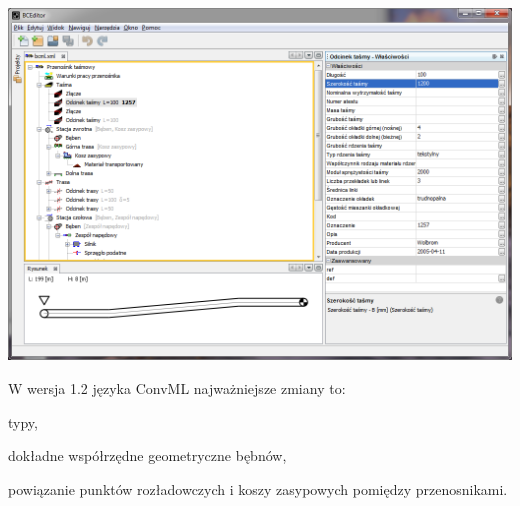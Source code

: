 \documentclass{beamer}
\begin{document}
\begin{frame}
\begin{center}
\includegraphics[width=\textwidth]{beamer/mainWin}
\end{center}
\end{frame}

\begin{frame}
W wersja 1.2 języka ConvML najważniejsze zmiany to:
\item typy,
\item dokładne współrzędne geometryczne bębnów,
\item powiązanie punktów rozładowczych i koszy zasypowych pomiędzy
  przenosnikami.
\end{frame}
\end{document}
